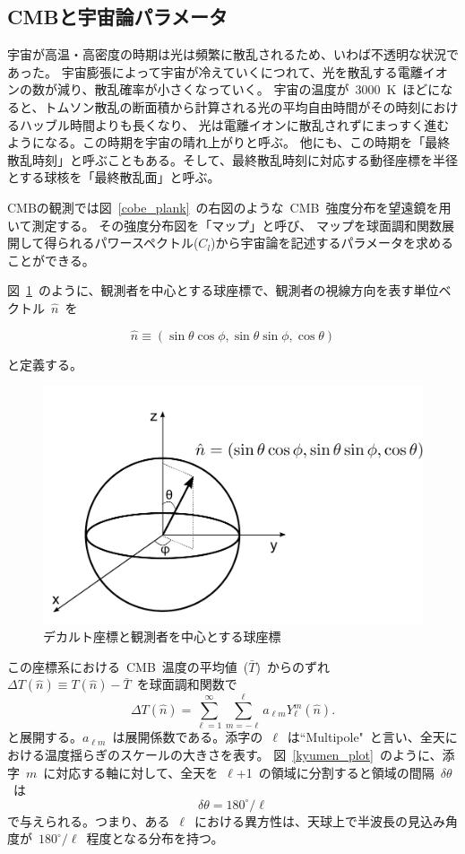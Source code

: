 \subsection{CMBと宇宙論パラメータ}
宇宙が高温・高密度の時期は光は頻繁に散乱されるため、いわば不透明な状況であった。
宇宙膨張によって宇宙が冷えていくにつれて、光を散乱する電離イオンの数が減り、散乱確率が小さくなっていく。
宇宙の温度が~3000~K~ほどになると、トムソン散乱の断面積から計算される光の平均自由時間がその時刻におけるハッブル時間よりも長くなり、
光は電離イオンに散乱されずにまっすく進むようになる。この時期を宇宙の晴れ上がりと呼ぶ。
他にも、この時期を「最終散乱時刻」と呼ぶこともある。そして、最終散乱時刻に対応する動径座標を半径とする球核を「最終散乱面」と呼ぶ。

CMBの観測では図~\ref{cobe_plank}~の右図のような~CMB~強度分布を望遠鏡を用いて測定する。
その強度分布図を「マップ」と呼び、
マップを球面調和関数展開して得られるパワースペクトル($C_l$)から宇宙論を記述するパラメータを求めることができる。

図~\ref{kyumen}~のように、観測者を中心とする球座標で、観測者の視線方向を表す単位ベクトル~$\hat{n}$~を

\begin{equation}
  \hat{n} \equiv (\sin\theta \cos\phi , \sin\theta \sin\phi, \cos\theta)
\end{equation}

と定義する。

\begin{figure}[htbp]
  \centering
  \includegraphics[width=0.6\columnwidth]{2_cosmology/figs/kyumen_all.pdf}
  \caption{デカルト座標と観測者を中心とする球座標}
  \label{kyumen}
\end{figure}

この座標系における~CMB~温度の平均値~($\bar{T}$)~からのずれ~$\Delta T(\hat{n}) \equiv T(\hat{n}) - \bar{T}$~を球面調和関数で
\begin{equation}
 \Delta T(\hat{n}) = \sum_{\ell=1}^{\infty}\sum_{m=-\ell}^{\ell}a_{\ell m}Y_\ell^m(\hat{n}).
\end{equation}
と展開する。$a_{\ell m}$~は展開係数である。添字の~$\ell$~は``Multipole"~と言い、全天における温度揺らぎのスケールの大きさを表す。
図~\ref{kyumen_plot}~のように、添字~$m$~に対応する軸に対して、全天を~$\ell$+1~の領域に分割すると領域の間隔~$\delta \theta$~は
\begin{equation}
  \delta \theta = 180^{\circ} /\ell
\end{equation}
で与えられる。つまり、ある~$\ell$~における異方性は、天球上で半波長の見込み角度が~$180^{\circ} /\ell$~程度となる分布を持つ。

